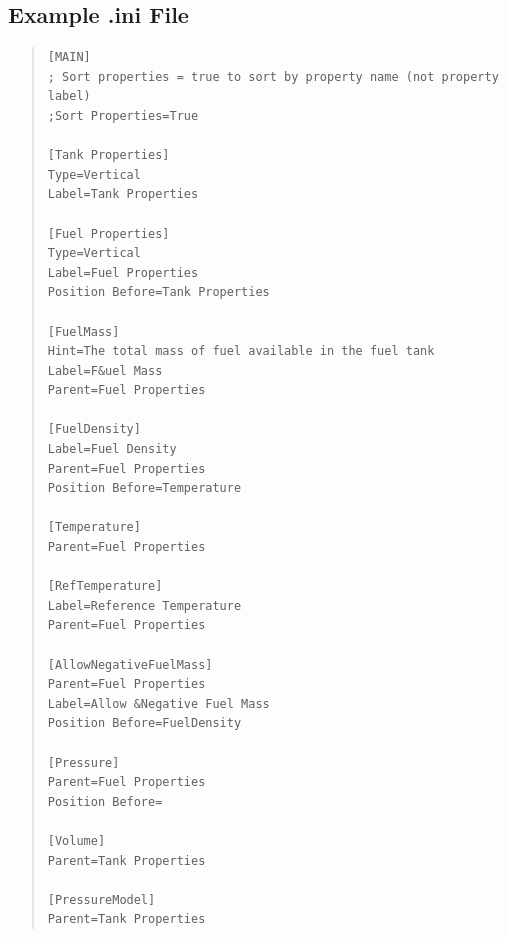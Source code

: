 \documentclass[10pt,letterpaper]{article}
\begin{document}
\subsection{Example .ini File}
\begin{quote}
\begin{verbatim}
[MAIN]
; Sort properties = true to sort by property name (not property label)
;Sort Properties=True

[Tank Properties]
Type=Vertical
Label=Tank Properties

[Fuel Properties]
Type=Vertical
Label=Fuel Properties
Position Before=Tank Properties

[FuelMass]
Hint=The total mass of fuel available in the fuel tank
Label=F&uel Mass
Parent=Fuel Properties

[FuelDensity]
Label=Fuel Density
Parent=Fuel Properties
Position Before=Temperature

[Temperature]
Parent=Fuel Properties

[RefTemperature]
Label=Reference Temperature
Parent=Fuel Properties

[AllowNegativeFuelMass]
Parent=Fuel Properties
Label=Allow &Negative Fuel Mass
Position Before=FuelDensity

[Pressure]
Parent=Fuel Properties
Position Before=

[Volume]
Parent=Tank Properties

[PressureModel]
Parent=Tank Properties
\end{verbatim}
\end{quote}

%
%
%
%
%
%
\end{document}
